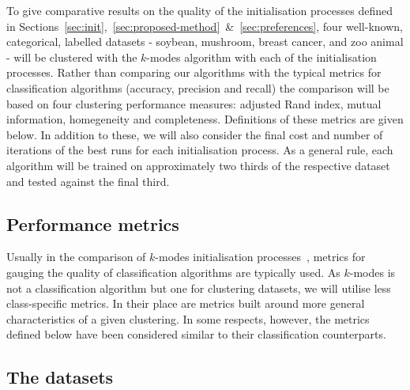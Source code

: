 To give comparative results on the quality of the initialisation processes 
defined in
Sections~\ref{sec:init},~\ref{sec:proposed-method}~\&~\ref{sec:preferences},
four well-known, categorical, labelled datasets - soybean, mushroom, breast
cancer, and zoo animal - will be clustered with the \(k\)-modes algorithm with
each of the initialisation processes. Rather than comparing our algorithms with
the typical metrics for classification algorithms (accuracy, precision and
recall) the comparison will be based on four clustering performance measures:
adjusted Rand index, mutual information, homegeneity and completeness.
Definitions of these metrics are given below. In addition to these, we will also
consider the final cost and number of iterations of the best runs for each
initialisation process. As a general rule, each algorithm will be trained on
approximately two thirds of the respective dataset and tested against the final
third.

\subsection{Performance metrics}\label{subsec:metrics}

Usually in the comparison of \(k\)-modes initialisation
processes~\cite{Huang98}\cite{Cao09}, metrics for gauging the quality of
classification algorithms are typically used. As \(k\)-modes is not a
classification algorithm but one for clustering datasets, we will utilise less
class-specific metrics. In their place are metrics built around more general
characteristics of a given clustering. In some respects, however, the metrics
defined below have been considered similar to their classification counterparts.

\begin{definition}\label{def:adjusted-rand}
\end{definition}

\begin{definition}\label{def:mutual-info}
\end{definition}

\begin{definition}\label{def:homogeneity}
\end{definition}

\begin{definition}\label{def:completeness}
\end{definition}

\subsection{The datasets}\label{subsec:datasets}

